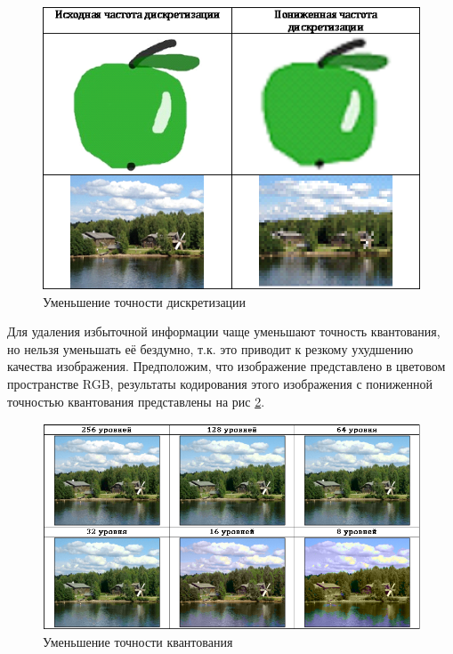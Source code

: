 \begin{figure}[H]
	\begin{center}
		\includegraphics[scale=0.9]{pics/quantization/discretization.png}
		\caption{Уменьшение точности дискретизации} 
		\label{pic:discretization}
	\end{center}
\end{figure}
Для удаления избыточной информации чаще уменьшают точность квантования, но нельзя уменьшать её бездумно, т.к. это приводит к резкому ухудшению качества изображения. Предположим, что изображение представлено в цветовом пространстве RGB, результаты кодирования этого изображения с пониженной точностью квантования представлены на рис \ref{pic:levelsOfQuantization}.
\begin{figure}[H]
	\begin{center}
		\includegraphics[scale=0.85]{pics/quantization/levelsOfQuantization.png}
		\caption{Уменьшение точности квантования} 
		\label{pic:levelsOfQuantization}
	\end{center}
\end{figure}
